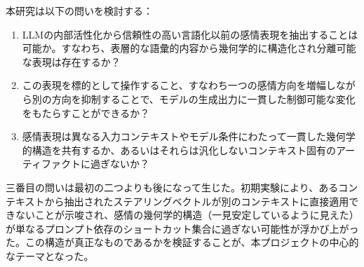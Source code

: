 本研究は以下の問いを検討する：
\begin{enumerate}
    \item LLMの内部活性化から信頼性の高い言語化以前の感情表現を抽出することは可能か。すなわち、表層的な語彙的内容から幾何学的に構造化され分離可能な表現は存在するか？
    \item この表現を標的として操作すること、すなわち一つの感情方向を増幅しながら別の方向を抑制することで、モデルの生成出力に一貫した制御可能な変化をもたらすことができるか？
    \item 感情表現は異なる入力コンテキストやモデル条件にわたって一貫した幾何学的構造を共有するか、あるいはそれらは汎化しないコンテキスト固有のアーティファクトに過ぎないか？
\end{enumerate}

三番目の問いは最初の二つよりも後になって生じた。初期実験により、あるコンテキストから抽出されたステアリングベクトルが別のコンテキストに直接適用できないことが示唆され、感情の幾何学的構造（一見安定しているように見えた）が単なるプロンプト依存のショートカット集合に過ぎない可能性が浮かび上がった。この構造が真正なものであるかを検証することが、本プロジェクトの中心的なテーマとなった。

